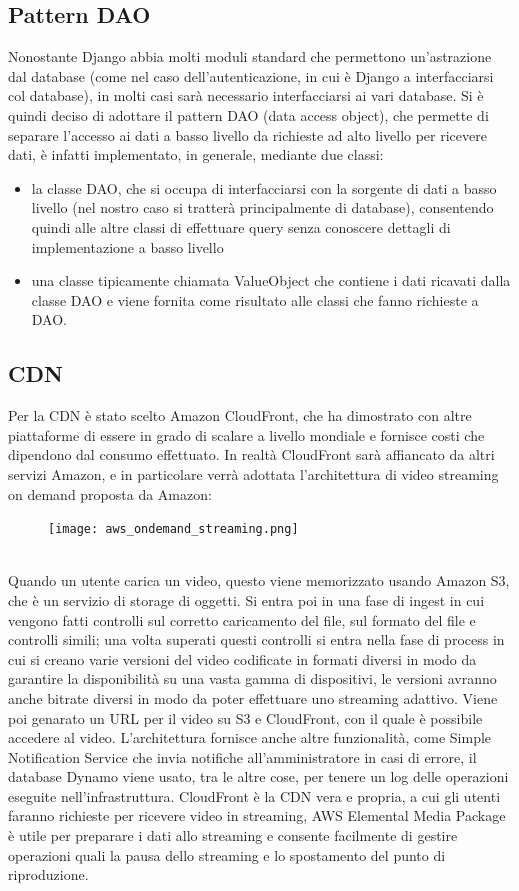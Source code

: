 \subsection{Pattern DAO}
Nonostante Django abbia molti moduli standard che permettono un'astrazione dal database (come nel caso dell'autenticazione, in cui è Django a interfacciarsi col database), in molti casi sarà necessario interfacciarsi ai vari database. Si è quindi deciso di adottare il pattern DAO (data access object), che permette di separare l'accesso ai dati a basso livello da richieste ad alto livello per ricevere dati, è infatti implementato, in generale, mediante due classi:
\begin{itemize}
\item la classe DAO, che si occupa di interfacciarsi con la sorgente di dati a basso livello (nel nostro caso si tratterà principalmente di database), consentendo quindi alle altre classi di effettuare query senza conoscere dettagli di implementazione a basso livello
\item una classe tipicamente chiamata ValueObject che contiene i dati ricavati dalla classe DAO e viene fornita come risultato alle classi che fanno richieste a DAO.
\end{itemize}
\subsection{CDN}
Per la CDN è stato scelto Amazon CloudFront, che ha dimostrato con altre piattaforme di essere in grado di scalare a livello mondiale e fornisce costi che dipendono dal consumo effettuato. In realtà CloudFront sarà affiancato da altri servizi Amazon, e in particolare verrà adottata l'architettura di video streaming on demand proposta da Amazon:\\
\begin{figure}[!h]
\centering
\texttt{[image: aws\_ondemand\_streaming.png]}
\end{figure}\\
Quando un utente carica un video, questo viene memorizzato usando Amazon S3, che è un servizio di storage di oggetti. Si entra poi in una fase di ingest in cui vengono fatti controlli sul corretto caricamento del file, sul formato del file e controlli simili; una volta superati questi controlli si entra nella fase di process in cui si creano varie versioni del video codificate in formati diversi in modo da garantire la disponibilità su una vasta gamma di dispositivi, le versioni avranno anche bitrate diversi in modo da poter effettuare uno streaming adattivo. Viene poi genarato un URL per il video su S3 e CloudFront, con il quale è possibile accedere al video. L'architettura fornisce anche altre funzionalità, come Simple Notification Service che invia notifiche all'amministratore in casi di errore, il database Dynamo viene usato, tra le altre cose, per tenere un log delle operazioni eseguite nell'infrastruttura. CloudFront è la CDN vera e propria, a cui gli utenti faranno richieste per ricevere video in streaming, AWS Elemental Media Package è utile per preparare i dati allo streaming e consente facilmente di gestire operazioni quali la pausa dello streaming e lo spostamento del punto di riproduzione.

